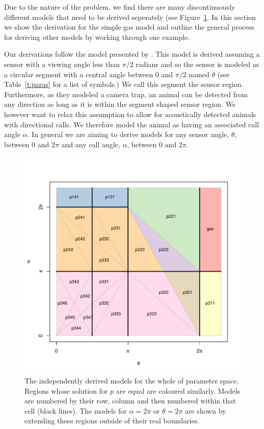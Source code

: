 \documentclass[a4paper,10pt,reqno,oneside]{amsart}
\begin{document}
Due to the nature of the problem, we find there are many discontinuously different models that need to be derived seperately (see Figure~\ref{f:regions}. In this section we show the derivation for the simple gas model and outline the general process for deriving other models by working through one example. 

Our derivations follow the model presented by \citep{rowcliffe2008estimating}. This model is derived assuming a sensor with a viewing angle less than $\pi/2$ radians and so the sensor is modeled as a circular segment with a central angle between 0 and  $\pi/2$ named  $\theta$ (see Table~\ref{t:paras} for a list of symbols.) We call this segment the sensor region. Furthermore, as they modeled a camera trap, an animal can be detected from any direction as long as it is within the segment shaped sensor region. We however want to relax this assumption to allow for acoustically detected animals with directional calls. We therefore model the animal as having an associated call angle $\alpha$. In general we are aiming to derive models for any sensor angle, $ \theta$, between 0 and $2\pi$ and any call angle, $ \alpha$, between 0 and $2\pi$. 



\begin{figure}
\centering
\includegraphics[width=1\textwidth]{imgs/equalRegions.pdf}
\caption{The independently derived models for the whole of parameter space. Regions whose solution for $p$ are equal are coloured similarly. Models are numbered by their row, column and then numbered within that cell (black lines). The models for $\alpha = 2\pi$ or $\theta =  2\pi$ are shown by extending these regions outside of their real boundaries.}
\label{f:regions}
\end{figure}
\end{document}
